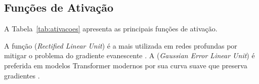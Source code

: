 \subsection{Funções de Ativação}
A Tabela~\ref{tab:ativacoes} apresenta as principais funções de ativação.
\begin{table}[htb]
\centering
    \small
\caption{Funções de ativação mais comuns}
\label{tab:ativacoes}
\end{table}
A função  (\textit{Rectified Linear Unit}) é a mais utilizada
em redes profundas por mitigar o problema do gradiente evanescente
\cite{nair2010relu}. A  (\textit{Gaussian Error Linear Unit})
é preferida em modelos Transformer modernos por sua curva suave que preserva
gradientes \cite{hendrycks2016gaussian}.
